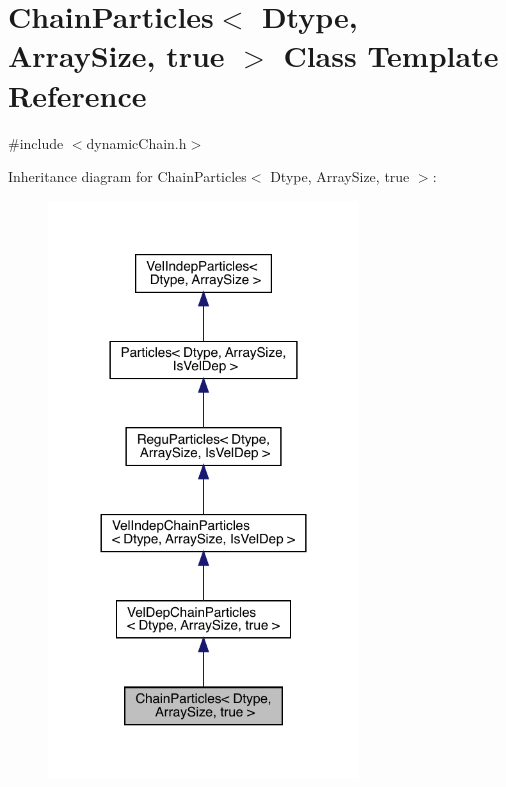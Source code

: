 \hypertarget{class_chain_particles_3_01_dtype_00_01_array_size_00_01true_01_4}{}\section{Chain\+Particles$<$ Dtype, Array\+Size, true $>$ Class Template Reference}
\label{class_chain_particles_3_01_dtype_00_01_array_size_00_01true_01_4}


{\ttfamily \#include $<$dynamic\+Chain.\+h$>$}



Inheritance diagram for Chain\+Particles$<$ Dtype, Array\+Size, true $>$\+:
\nopagebreak
\begin{figure}[H]
\begin{center}
\leavevmode
\includegraphics[width=233pt]{class_chain_particles_3_01_dtype_00_01_array_size_00_01true_01_4__inherit__graph}
\end{center}
\end{figure}


